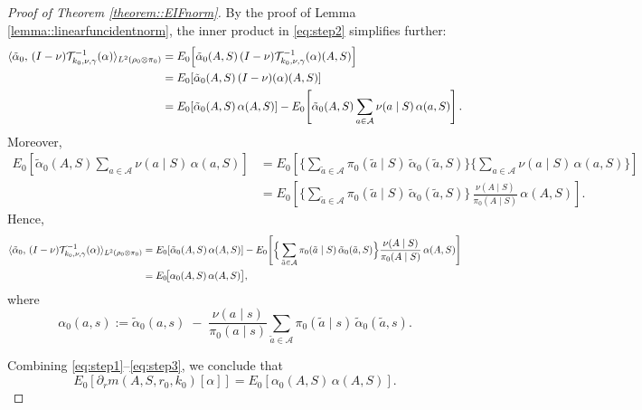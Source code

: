 \documentclass[11pt]{article}
\theoremstyle{plain}
\begin{document}
\begin{proof}[Proof of Theorem \ref{theorem::EIFnorm}]
By the proof of Lemma \ref{lemma::linearfuncidentnorm}, the inner product in \eqref{eq:step2} simplifies further:
\begin{align}
\langle \tilde{\alpha}_0,\,(I - \nu)\mathcal{T}_{k_0,\nu,\gamma}^{-1}(\alpha) \rangle_{L^2(\rho_0 \otimes \pi_0)} 
&= E_0\!\left[\tilde{\alpha}_0(A,S)\,(I - \nu)\mathcal{T}_{k_0,\nu,\gamma}^{-1}(\alpha)(A,S)\right] \notag \\
&= E_0\!\left[\tilde{\alpha}_0(A,S)\,(I - \nu)(\alpha)(A,S)\right] \label{eq:step2a} \\
&= E_0\!\left[\tilde{\alpha}_0(A,S)\,\alpha(A,S)\right] 
   - E_0\!\left[\tilde{\alpha}_0(A,S)\sum_{a \in \mathcal{A}}\nu(a \mid S)\,\alpha(a,S)\right].
\label{eq:step3}
\end{align}
Moreover,
\begin{align*}
E_0\!\left[\tilde{\alpha}_0(A,S)\sum_{a \in \mathcal{A}} \nu(a \mid S)\,\alpha(a,S)\right]
&= E_0\!\left[\Big\{\sum_{\tilde a \in \mathcal{A}}\pi_0(\tilde a \mid S)\,\tilde{\alpha}_0(\tilde a,S)\Big\}
                 \Big\{\sum_{a \in \mathcal{A}} \nu(a \mid S)\,\alpha(a,S)\Big\}\right] \\
&= E_0\!\left[\Big\{\sum_{\tilde a \in \mathcal{A}}\pi_0(\tilde a \mid S)\,\tilde{\alpha}_0(\tilde a,S)\Big\}
              \,\frac{\nu(A \mid S)}{\pi_0(A \mid S)}\,\alpha(A,S)\right].
\end{align*}
Hence,
\begin{align}
\langle \tilde{\alpha}_0,\,(I - \nu)\mathcal{T}_{k_0,\nu,\gamma}^{-1}(\alpha) \rangle_{L^2(\rho_0 \otimes \pi_0)}
&= E_0\!\left[\tilde{\alpha}_0(A,S)\,\alpha(A,S)\right]
  - E_0\!\left[\Big\{\sum_{\tilde a \in \mathcal{A}}\pi_0(\tilde a \mid S)\,\tilde{\alpha}_0(\tilde a,S)\Big\}
                 \frac{\nu(A \mid S)}{\pi_0(A \mid S)}\,\alpha(A,S)\right] \notag \\
&= E_0\!\big[\alpha_0(A,S)\,\alpha(A,S)\big],
\label{eq:alpha0}
\end{align}
where
\[
\alpha_0(a,s)
:= \tilde{\alpha}_0(a,s)\;-\;\frac{\nu(a \mid s)}{\pi_0(a \mid s)}
   \sum_{\tilde a \in \mathcal{A}} \pi_0(\tilde a \mid s)\,\tilde{\alpha}_0(\tilde a,s).
\]

Combining \eqref{eq:step1}–\eqref{eq:step3}, we conclude that
\begin{equation}
E_0[\partial_r m(A, S, r_0, k_0)[\alpha]] = E_0[\alpha_0(A,S)\,\alpha(A,S)].
\label{eq:final}
\end{equation}




\end{proof}
\end{document}
